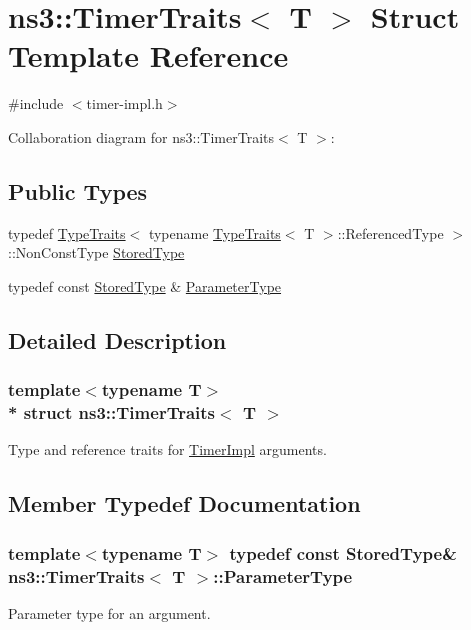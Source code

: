 \hypertarget{structns3_1_1TimerTraits}{}\section{ns3\+:\+:Timer\+Traits$<$ T $>$ Struct Template Reference}
\label{structns3_1_1TimerTraits}


{\ttfamily \#include $<$timer-\/impl.\+h$>$}



Collaboration diagram for ns3\+:\+:Timer\+Traits$<$ T $>$\+:
\subsection*{Public Types}
\begin{DoxyCompactItemize}
\item 
typedef \hyperlink{structTypeTraits}{Type\+Traits}$<$ typename \hyperlink{structTypeTraits}{Type\+Traits}$<$ T $>$\+::Referenced\+Type $>$\+::Non\+Const\+Type \hyperlink{structns3_1_1TimerTraits_abbe3a268222f2bedc22882088f61a6b8}{Stored\+Type}
\item 
typedef const \hyperlink{structns3_1_1TimerTraits_abbe3a268222f2bedc22882088f61a6b8}{Stored\+Type} \& \hyperlink{structns3_1_1TimerTraits_af41cea1736f0d9319a1be67d7640529a}{Parameter\+Type}
\end{DoxyCompactItemize}


\subsection{Detailed Description}
\subsubsection*{template$<$typename T$>$\\*
struct ns3\+::\+Timer\+Traits$<$ T $>$}

Type and reference traits for \hyperlink{classns3_1_1TimerImpl}{Timer\+Impl} arguments. 

\subsection{Member Typedef Documentation}
\subsubsection[{\texorpdfstring{Parameter\+Type}{ParameterType}}]{\setlength{\rightskip}{0pt plus 5cm}template$<$typename T$>$ typedef const {\bf Stored\+Type}\& {\bf ns3\+::\+Timer\+Traits}$<$ T $>$\+::{\bf Parameter\+Type}}\hypertarget{structns3_1_1TimerTraits_af41cea1736f0d9319a1be67d7640529a}{}\label{structns3_1_1TimerTraits_af41cea1736f0d9319a1be67d7640529a}
Parameter type for an argument. 
